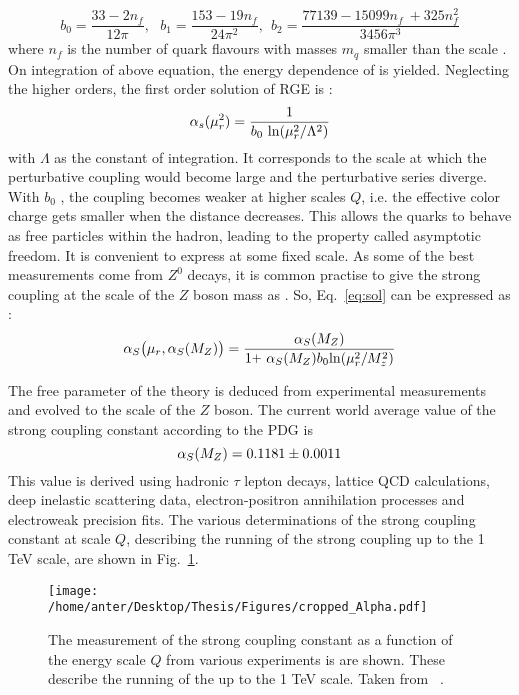 \begin{equation}
b_0 = \frac{33-2n_f}{12\pi}, ~~~b_1 = \frac{153-19n_f}{24\pi^2}, ~~b_2 = \frac{77139 - 15099n_f~\plus 325n^2_f}{3456\pi^3}
\end{equation}
where $n_f$ is the number of quark flavours with masses $m_q$ smaller than the scale \mur. On integration of above equation, the energy dependence of \alps is yielded. Neglecting the higher orders, the first order solution of RGE is :
\begin{equation}
\alpha_{s}(\mur^2)=\frac{1}{b_0~{\rm ln}(\mur^2/\Lambda^2)}
\label{eq:sol}
\end{equation}
with $\Lambda$ as the constant of integration. It corresponds to the scale at which the perturbative coupling would become large and the perturbative series diverge. With $b_0$ , the coupling becomes weaker at higher scales $Q$, i.e. the effective color charge gets smaller when the distance decreases. This allows the quarks to behave as free particles within the hadron, leading to the property called asymptotic freedom. It is convenient to express \alps at some fixed scale. As some of the best measurements come from $Z^0$ decays, it is common practise to give the strong coupling at the scale of the $Z$ boson mass as \alpsmz. So, Eq.~\ref{eq:sol} can be expressed as :
\begin{equation}
\alps\big(\mur,\alpsmz\big) = \frac{\alpsmz}{1\plus\alpsmz b_0{\rm ln}(\mur^2/M^2_z)}
\end{equation}

The free parameter \alps of the theory is deduced from experimental measurements and evolved to the scale of the $Z$ boson. The current world average value of the strong coupling constant according to the PDG \cite{Patrignani:2016xqp} is 
\begin{equation}
\alpha_S(M_Z) = 0.1181 \pm 0.0011
\end{equation}
This value is derived using hadronic $\tau$ lepton decays, lattice QCD calculations, deep inelastic scattering data, electron-positron annihilation processes and electroweak precision fits. The various determinations of the strong coupling constant at scale $Q$, describing the running of the strong coupling up to the 1 TeV scale, are shown in Fig.~\ref{fig:alpha_pdg}.

\begin{figure}[!h]
\begin{center}
\hspace*{-7mm}
\texttt{[image: /home/anter/Desktop/Thesis/Figures/cropped\_Alpha.pdf]}\\
\vspace*{4mm}
\caption[PDG]{The measurement of the strong coupling constant \alps as a function of the energy scale $Q$ from various experiments is are shown. These describe the running of the \alps up to the 1 TeV scale. Taken from ~\cite{Patrignani:2016xqp}.}
\label{fig:alpha_pdg}
\end{center}
\end{figure}

